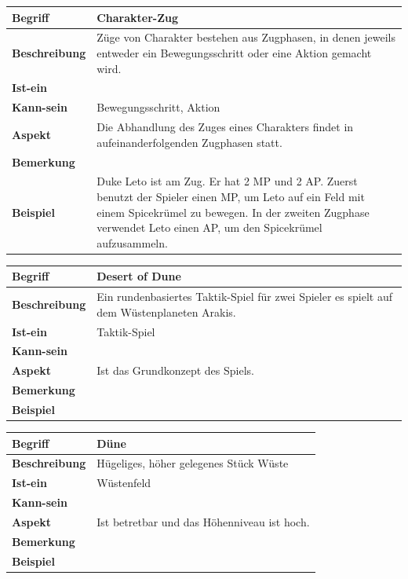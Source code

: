 \documentclass[12pt]{article}
\begin{document}
\begin{tabularx}{\linewidth}{|l|X|}
\hline
\textbf{Begriff} & \textbf{Charakter-Zug} \\
\hline
\textbf{Beschreibung} & Züge von Charakter bestehen aus Zugphasen, in denen jeweils entweder ein Bewegungsschritt oder eine Aktion gemacht wird.\\
\hline
\textbf{Ist-ein} & \\
\hline
\textbf{Kann-sein} & Bewegungsschritt, Aktion\\
\hline
\textbf{Aspekt} & Die Abhandlung des Zuges eines Charakters findet in aufeinanderfolgenden Zugphasen statt.\\
\hline
\textbf{Bemerkung} &  \\
\hline
\textbf{Beispiel} & Duke Leto ist am Zug. Er hat 2 MP und 2 AP. Zuerst benutzt der Spieler einen MP, um Leto auf ein Feld mit einem Spicekrümel zu bewegen. In der zweiten Zugphase verwendet Leto einen AP, um den Spicekrümel aufzusammeln.\\
\hline
\end{tabularx}

\begin{tabularx}{\linewidth}{|l|X|}
\hline
\textbf{Begriff} & \textbf{Desert of Dune} \\
\hline
\textbf{Beschreibung} & Ein rundenbasiertes Taktik-Spiel für zwei Spieler es spielt auf dem Wüstenplaneten Arakis. \\
\hline
\textbf{Ist-ein} & Taktik-Spiel\\
\hline
\textbf{Kann-sein} & \\
\hline
\textbf{Aspekt} & Ist das Grundkonzept des Spiels. \\
\hline
\textbf{Bemerkung} & \\
\hline
\textbf{Beispiel} &  \\
\hline
\end{tabularx}

\begin{tabularx}{\linewidth}{|l|X|}
\hline
\textbf{Begriff} & \textbf{Düne} \\
\hline
\textbf{Beschreibung} & Hügeliges, höher gelegenes Stück Wüste \\
\hline
\textbf{Ist-ein} & Wüstenfeld \\
\hline
\textbf{Kann-sein} & \\
\hline
\textbf{Aspekt} & Ist betretbar und das Höhenniveau ist hoch. \\
\hline
\textbf{Bemerkung} &  \\
\hline
\textbf{Beispiel} &  \\
\hline
\end{tabularx}
\end{document}
